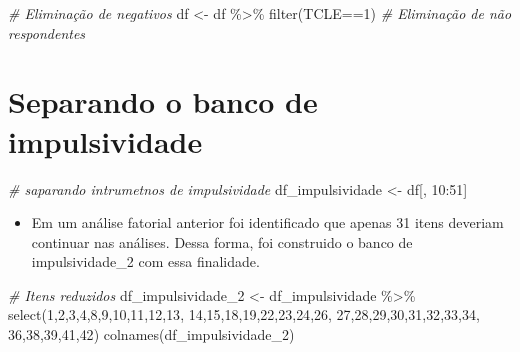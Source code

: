 \documentclass[
]{article}
\newenvironment{Shaded}{\begin{snugshade}}{\end{snugshade}}
\newcommand{\CommentTok}[1]{\textcolor[rgb]{0.56,0.35,0.01}{\textit{#1}}}
\newcommand{\DecValTok}[1]{\textcolor[rgb]{0.00,0.00,0.81}{#1}}
\newcommand{\FunctionTok}[1]{\textcolor[rgb]{0.00,0.00,0.00}{#1}}
\newcommand{\NormalTok}[1]{#1}
\newcommand{\OtherTok}[1]{\textcolor[rgb]{0.56,0.35,0.01}{#1}}
\newcommand{\SpecialCharTok}[1]{\textcolor[rgb]{0.00,0.00,0.00}{#1}}
\providecommand{\tightlist}{%
  \setlength{\itemsep}{0pt}\setlength{\parskip}{0pt}}
\begin{document}
\begin{Shaded}
\begin{Highlighting}[]
\CommentTok{\# Eliminação de negativos}
\NormalTok{df }\OtherTok{\textless{}{-}}\NormalTok{ df }\SpecialCharTok{\%\textgreater{}\%} \FunctionTok{filter}\NormalTok{(TCLE}\SpecialCharTok{==}\DecValTok{1}\NormalTok{) }\CommentTok{\# Eliminação de não respondentes}
\end{Highlighting}
\end{Shaded}

\hypertarget{separando-o-banco-de-impulsividade}{%
\section{Separando o banco de
impulsividade}\label{separando-o-banco-de-impulsividade}}

\begin{Shaded}
\begin{Highlighting}[]
\CommentTok{\# saparando intrumetnos de impulsividade}
\NormalTok{df\_impulsividade }\OtherTok{\textless{}{-}}\NormalTok{ df[, }\DecValTok{10}\SpecialCharTok{:}\DecValTok{51}\NormalTok{]}
\end{Highlighting}
\end{Shaded}

\begin{itemize}
\tightlist
\item
  Em um análise fatorial anterior foi identificado que apenas 31 itens
  deveriam continuar nas análises. Dessa forma, foi construido o banco
  de impulsividade\_2 com essa finalidade.
\end{itemize}

\begin{Shaded}
\begin{Highlighting}[]
\CommentTok{\# Itens reduzidos}
\NormalTok{df\_impulsividade\_2 }\OtherTok{\textless{}{-}}\NormalTok{ df\_impulsividade }\SpecialCharTok{\%\textgreater{}\%} \FunctionTok{select}\NormalTok{(}\DecValTok{1}\NormalTok{,}\DecValTok{2}\NormalTok{,}\DecValTok{3}\NormalTok{,}\DecValTok{4}\NormalTok{,}\DecValTok{8}\NormalTok{,}\DecValTok{9}\NormalTok{,}\DecValTok{10}\NormalTok{,}\DecValTok{11}\NormalTok{,}\DecValTok{12}\NormalTok{,}\DecValTok{13}\NormalTok{,}
                                                  \DecValTok{14}\NormalTok{,}\DecValTok{15}\NormalTok{,}\DecValTok{18}\NormalTok{,}\DecValTok{19}\NormalTok{,}\DecValTok{22}\NormalTok{,}\DecValTok{23}\NormalTok{,}\DecValTok{24}\NormalTok{,}\DecValTok{26}\NormalTok{,}
                                                  \DecValTok{27}\NormalTok{,}\DecValTok{28}\NormalTok{,}\DecValTok{29}\NormalTok{,}\DecValTok{30}\NormalTok{,}\DecValTok{31}\NormalTok{,}\DecValTok{32}\NormalTok{,}\DecValTok{33}\NormalTok{,}\DecValTok{34}\NormalTok{,}
                                                  \DecValTok{36}\NormalTok{,}\DecValTok{38}\NormalTok{,}\DecValTok{39}\NormalTok{,}\DecValTok{41}\NormalTok{,}\DecValTok{42}\NormalTok{)}
\FunctionTok{colnames}\NormalTok{(df\_impulsividade\_2)}
\end{Highlighting}
\end{Shaded}
\end{document}
